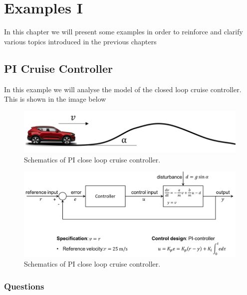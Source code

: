 \chapter{Examples I}
\label{examples_I}
In this chapter we will present some examples in order to reinforce and clarify various topics introduced in the previous chapters

\section{PI Cruise Controller}
In this example we will analyse the model of the closed loop cruise controller. This is shown in the image below


\begin{figure}[!htb]
\begin{center}
\includegraphics[scale=0.380]{img/model_based_eng/P1_1_2_1_ex_2.png}
\end{center}
\caption{Schematics of PI close loop cruise controller.}
\label{P1_1_2_1_ex_2}
\end{figure}

\begin{figure}[!htb]
\begin{center}
\includegraphics[scale=0.280]{img/model_based_eng/P2_1_2_1_ex_2_cruise.png}
\end{center}
\caption{Schematics of PI close loop cruise controller.}
\label{P2_1_2_1_ex_2_cruise}
\end{figure}


\subsection{Questions}

